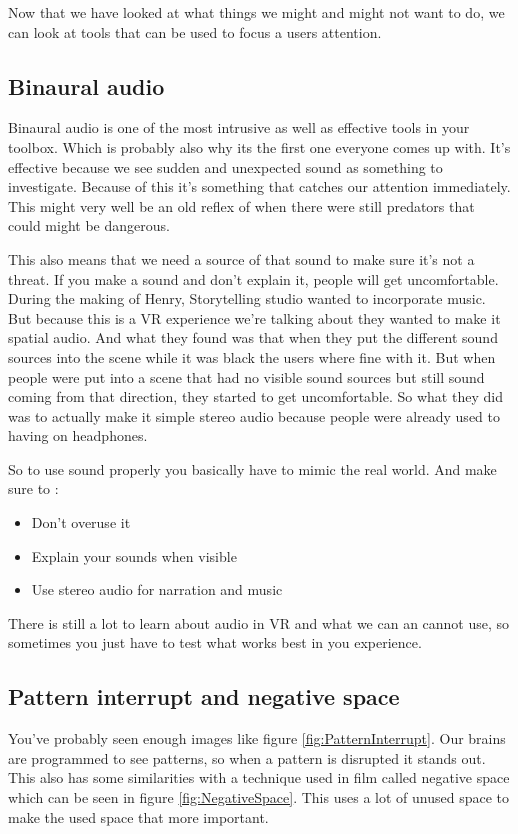 \documentclass{report}
\begin{document}
				Now that we have looked at what things we might and might not want to do, we can look at tools that can be used to focus a users attention.
				
				\subsection{Binaural audio}
				Binaural audio is one of the most intrusive as well as effective tools in your toolbox. Which is probably also why its the first one everyone comes up with. It's effective because we see sudden and unexpected sound as something to investigate. Because of this it's something that catches our attention immediately.			
				This might very well  be an old reflex of when there were still predators that could might be dangerous.  
				
				This also means that we need a source of that sound to make sure it's not a threat. If you make a sound and don't explain it, people will get uncomfortable. During the making of Henry, Storytelling studio wanted to incorporate music. But because this is a VR experience we're talking about they wanted to make it spatial audio. And what they found was that when they put the different sound sources into the scene while it was black the users where fine with it. But when people were put into a scene that had no visible sound sources but still sound coming from that direction, they started to get uncomfortable. So what they did was to actually make it simple stereo audio because people were already used to having on headphones.
				
				So to use sound properly you basically have to mimic the real world. 
				And make sure to :
				\begin{itemize}
					\item Don't overuse it
					\item Explain your sounds when visible
					\item Use stereo audio for narration and music
				\end{itemize}
				There is still a lot to learn about audio in VR and what we can an cannot use, so sometimes you just have to test what works best in you experience. 
				
				
				
				
				\subsection{Pattern interrupt and negative space}
				You've probably seen enough images like figure \ref{fig:PatternInterrupt}. Our brains are programmed to see patterns, so when a pattern is disrupted it stands out. This also has some similarities with a technique used in film called negative space which can be seen in figure \ref{fig:NegativeSpace}. This uses a lot of unused space to make the used space that more important. 
							
\end{document}
